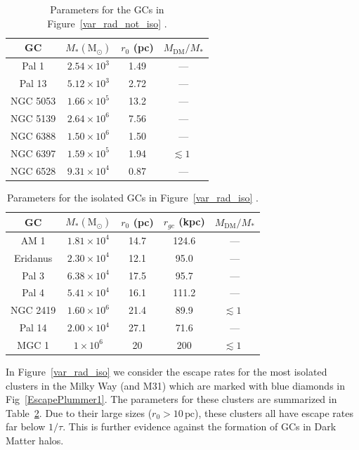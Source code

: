 \documentclass[aps,floatfix,prd,showpacs]{revtex4}
\newcommand{\MDM}{M_{\mathrm{DM}}}
\newcommand{\pc}{\textrm{pc}}
\begin{document}
%
%
%
\begin{table}
\centering
\begin{tabular}{ | c | c | c | c |}
\hline
GC & $M_* (\mathrm{M}_\odot)$ & $r_0$ (pc) & $\MDM/M_*$ \\
\hline
Pal 1 & $2.54\times10^3$ & 1.49 & ---\\
Pal 13 & $5.12\times10^3$ & 2.72 & ---\\
NGC 5053 & $1.66\times10^5$ & 13.2 & ---\\
NGC 5139 & $2.64\times10^6$ & 7.56 & ---\\
NGC 6388 & $1.50\times10^6$ & 1.50& ---\\
NGC 6397 & $1.59\times10^5$ & 1.94 & $\lesssim 1$\ \cite{Shin}\\
NGC 6528 & $9.31\times10^4$ & 0.87 & ---\\
\hline
\end{tabular}
\caption{Parameters for the GCs in Figure~\ref{var_rad_not_iso} \cite{Harris}.}
\label{table_not_iso}
\end{table}
%
\begin{table}
\centering
\begin{tabular}{ | c | c | c | c | c |}
\hline
GC & $M_* (\mathrm{M}_\odot)$ & $r_0$ (pc) & $r_{gc}$ (kpc) & $\MDM/M_*$\\
\hline
AM 1 & $1.81\times10^4$ & 14.7 & 124.6 & ---\\
Eridanus & $2.30\times10^4$ & 12.1 & 95.0 & ---\\
Pal 3 & $6.38\times10^4$ & 17.5 & 95.7 &---\\
Pal 4 & $5.41\times10^4$ & 16.1 & 111.2 & ---\\
NGC 2419 & $1.60\times10^6$ & 21.4& 89.9 &$\lesssim 1$\ \cite{Conroy,Ibata2013} \\
Pal 14 & $2.00\times10^4$ & 27.1 & 71.6 & --- \\
MGC 1 & $1\times10^6$ & 20 & 200 & $\lesssim 1$\ \cite{Conroy} \\
\hline
\end{tabular}
\caption{Parameters for the isolated GCs in Figure~\ref{var_rad_iso} \cite{Harris}.}
\label{table_iso}
\end{table}

In Figure~\ref{var_rad_iso} we consider the escape rates for the most isolated clusters in the Milky Way (and M31) which are marked with blue diamonds in Fig~\ref{EscapePlummer1}. The parameters for these clusters are summarized in Table~\ref{table_iso}. Due to their large sizes ($r_0 > 10\, \pc$), these clusters all have escape rates far below $1/\tau$. This is further evidence against the formation of GCs in Dark Matter halos. 
\end{document}
